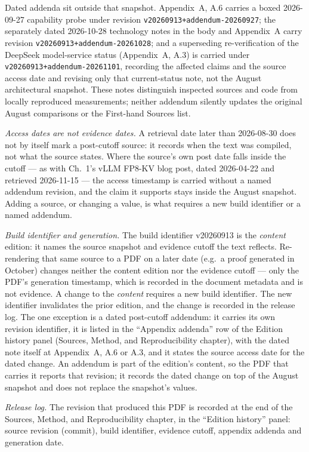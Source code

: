 Dated addenda sit outside that snapshot. Appendix~A, A.6 carries a boxed
2026-09-27 capability probe under revision
\texttt{v20260913+addendum-20260927}; the separately dated 2026-10-28
technology notes in the body and Appendix~A carry revision
\texttt{v20260913+addendum-20261028}; and a superseding re-verification of
the DeepSeek model-service status (Appendix~A, A.3) is carried under
\texttt{v20260913+addendum-20261101}, recording the affected claims and the
source access date and revising only that current-status note, not the August
architectural snapshot. These notes distinguish inspected sources and code
from locally reproduced measurements; neither addendum silently updates the
original August comparisons or the First-hand Sources list.

\emph{Access dates are not evidence dates.} A retrieval date later than
2026-08-30 does not by itself mark a post-cutoff source: it records when the
text was compiled, not what the source states. Where the source's own post
date falls inside the cutoff --- as with Ch.~1's vLLM FP8-KV blog post, dated
2026-04-22 and retrieved 2026-11-15 --- the access timestamp is carried
without a named addendum revision, and the claim it supports stays inside the
August snapshot. Adding a source, or changing a value, is what requires a new
build identifier or a named addendum.

\emph{Build identifier and generation.} The build identifier v20260913 is the
\emph{content} edition: it names the source snapshot and evidence cutoff the
text reflects. Re-rendering that same source to a PDF on a later date (e.g.\ a proof
generated in October) changes neither the content edition nor the
evidence cutoff --- only the PDF's generation timestamp, which is recorded in
the document metadata and is not evidence. A change to the \emph{content}
requires a new build identifier. The new identifier invalidates the prior
edition, and the change is recorded in the release log. The one exception is
a dated post-cutoff addendum: it carries its own revision identifier, it is
listed in the ``Appendix addenda'' row of the Edition history panel (Sources,
Method, and Reproducibility chapter), with the dated note itself at
Appendix~A, A.6 or A.3, and it states the source access date for
the dated change. An addendum is part of the edition's content, so the PDF
that carries it reports that revision; it records the dated change on top of
the August snapshot and does not replace the snapshot's values.

\emph{Release log.} The revision that produced this PDF is recorded at the
end of the Sources, Method, and Reproducibility chapter, in the ``Edition
history'' panel: source revision (commit), build identifier, evidence
cutoff, appendix addenda and generation date.

